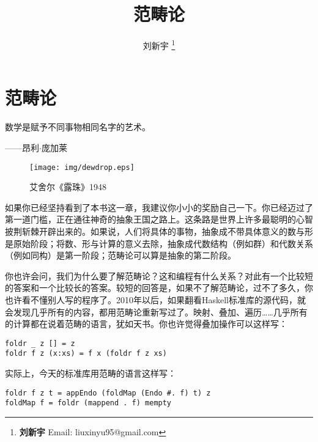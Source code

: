 \documentclass{article}
\begin{document}
\title{范畴论}

\author{刘新宇
\thanks{{\bfseries 刘新宇} \newline
  Email: liuxinyu95@gmail.com \newline}
  }

\maketitle
\fi


\ifx\wholebook\relax
\chapter{范畴论}
\fi

\epigraph{数学是赋予不同事物相同名字的艺术。}{——昂利$\cdot$庞加莱}


\begin{wrapfigure}{R}{0.4\textwidth}
 \centering
 \texttt{[image: img/dewdrop.eps]}
 \captionsetup{labelformat=empty}
 \caption{艾舍尔《露珠》1948}
 \label{fig:Escher-Dewdrop-1948}
\end{wrapfigure}

如果你已经坚持看到了本书这一章，我建议你小小的奖励自己一下。你已经迈过了第一道门槛，正在通往神奇的抽象王国之路上。这条路是世界上许多最聪明的心智披荆斩棘开辟出来的。如果说，人们将具体的事物，抽象成不带具体意义的数与形是原始阶段；将数、形与计算的意义去除，抽象成代数结构（例如群）和代数关系（例如同构）是第一阶段；范畴论可以算是抽象的第二阶段。

你也许会问，我们为什么要了解范畴论？这和编程有什么关系？对此有一个比较短的答案和一个比较长的答案。较短的回答是，如果不了解范畴论，过不了多久，你也许看不懂别人写的程序了。2010年以后，如果翻看Haskell标准库的源代码，就会发现几乎所有的内容，都用范畴论重新写过了。映射、叠加、遍历……几乎所有的计算都在说着范畴的语言，犹如天书。你也许觉得叠加操作可以这样写：

\lstset{language=Haskell, frame=single}
 \begin{lstlisting}
foldr _ z [] = z
foldr f z (x:xs) = f x (foldr f z xs)
\end{lstlisting}

实际上，今天的标准库用范畴的语言这样写：

\begin{lstlisting}
foldr f z t = appEndo (foldMap (Endo #. f) t) z
foldMap f = foldr (mappend . f) mempty
\end{lstlisting}
\end{document}
